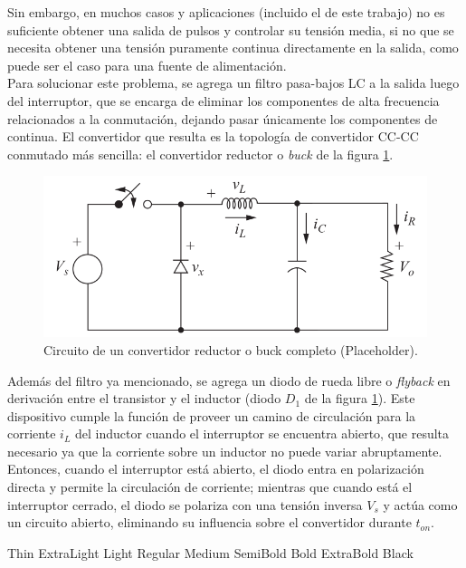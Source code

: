 Sin embargo, en muchos casos y aplicaciones (incluido el de este trabajo) no es suficiente obtener una salida de pulsos y controlar su tensión media, si no que se necesita obtener una tensión puramente continua directamente en la salida, como puede ser el caso para una fuente de alimentación.\\

Para solucionar este problema, se agrega un filtro pasa-bajos LC a la salida luego del interruptor, que se encarga de eliminar los componentes de alta frecuencia relacionados a la conmutación, dejando pasar únicamente los componentes de continua. El convertidor que resulta es la topología de convertidor CC-CC conmutado más sencilla: el {\Medium convertidor reductor} o {\Medium \textit{buck}} de la figura \ref{reductor}.

\begin{figure}[H]
    \centering
    \includegraphics[scale=0.4]{Imagenes/Reductor.png}
    \caption{Circuito de un convertidor reductor o buck completo (Placeholder).}
    \label{reductor}
\end{figure}

Además del filtro ya mencionado, se agrega un diodo de rueda libre o \textit{flyback} en derivación entre el transistor y el inductor (diodo $D_1$ de la figura \ref{reductor}). Este dispositivo cumple la función de proveer un camino de circulación para la corriente $i_L$ del inductor cuando el interruptor se encuentra abierto, que resulta necesario ya que la corriente sobre un inductor no puede variar abruptamente. Entonces, cuando el interruptor está abierto, el diodo entra en polarización directa y permite la circulación de corriente; mientras que cuando está el interruptor cerrado, el diodo se polariza con una tensión inversa $V_s$ y actúa como un circuito abierto, eliminando su influencia sobre el convertidor durante $t_{on}$.\\



\begin{center}
    {\Thin Thin} {\ExtraLight ExtraLight} {\Light Light} Regular {\Medium Medium}  {\SemiBold SemiBold} {\Bold Bold} {\ExtraBold ExtraBold} {\Black Black}
\end{center}